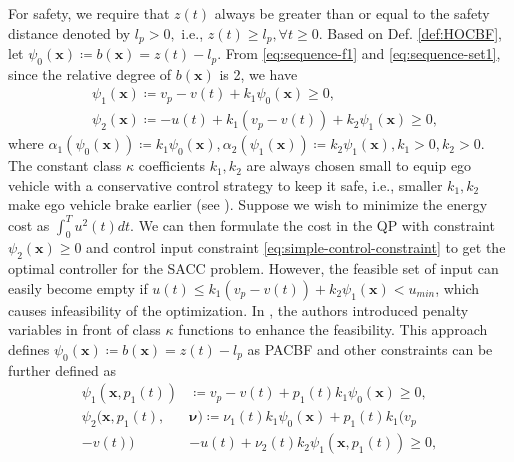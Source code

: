 For safety, we require that $z(t)$ always be greater than or equal to the safety distance denoted by $l_{p}>0,$ i.e., $z(t)\ge l_{p}, \forall t \ge 0.$ Based on Def. \ref{def:HOCBF}, let $\psi_{0}(\boldsymbol{x})\coloneqq b(\boldsymbol{x})=z(t)-l_{p}.$ From \eqref{eq:sequence-f1} and \eqref{eq:sequence-set1}, since the relative degree of $b(\boldsymbol{x})$ is 2, we have
\begin{equation}
\label{eq:SACC-HOCBF-sequence}
\begin{split}
&\psi_{1}(\boldsymbol{x})\coloneqq v_{p}-v(t)+k_{1}\psi_{0}(\boldsymbol{x})\ge 0
,\\
&\psi_{2}(\boldsymbol{x})\coloneqq -u(t)+k_{1}(v_{p}-v(t))+k_{2}\psi_{1}(\boldsymbol{x})\ge 0,
\end{split}
\end{equation}
where $\alpha_{1}(\psi_{0}(\boldsymbol{x}))\coloneqq k_{1}\psi_{0}(\boldsymbol{x}), \alpha_{2}(\psi_{1}(\boldsymbol{x}))\coloneqq k_{2}\psi_{1}(\boldsymbol{x}), k_{1}>0, k_{2}>0.$ The constant class $\kappa$ coefficients $k_{1},k_{2}$ are always chosen small to equip ego vehicle with a conservative control strategy to keep it safe, i.e., smaller $k_{1},k_{2}$ make ego vehicle brake earlier (see \cite{xiao2021high}). Suppose we wish to minimize the energy cost as $\int_{0}^{T} u^{2}(t)dt.$ We can then formulate the cost in the QP with constraint $\psi_{2}(\boldsymbol{x})\ge0$ and control input constraint \eqref{eq:simple-control-constraint} to get the optimal controller for the SACC problem. However, the feasible set of input can easily become empty if $u(t)\le k_{1}(v_{p}-v(t))+k_{2}\psi_{1}(\boldsymbol{x})<u_{min}$,  which causes infeasibility of the optimization. In \cite{xiao2021adaptive}, the authors introduced penalty variables in front of class $\kappa$ functions to enhance the feasibility. This approach defines $\psi_{0}(\boldsymbol{x})\coloneqq b(\boldsymbol{x})=z(t)-l_{p}$ as PACBF and other constraints can be further defined as
\begin{equation}
\label{eq:SACC-PACBF-sequence}
\begin{split}
\psi_{1}(\boldsymbol{x},p_{1}(t))&\coloneqq v_{p}-v(t)+p_{1}(t)k_{1}\psi_{0}(\boldsymbol{x})\ge 0,\\
\psi_{2}(\boldsymbol{x},p_{1}(t),&\boldsymbol{\nu})\coloneqq \nu_{1}(t)k_{1}\psi_{0}(\boldsymbol{x})+p_{1}(t)k_{1}(v_{p}\\
-v(t))&-u(t)+\nu_{2}(t)k_{2}\psi_{1}(\boldsymbol{x},p_{1}(t))\ge 0,
\end{split}
\end{equation}
